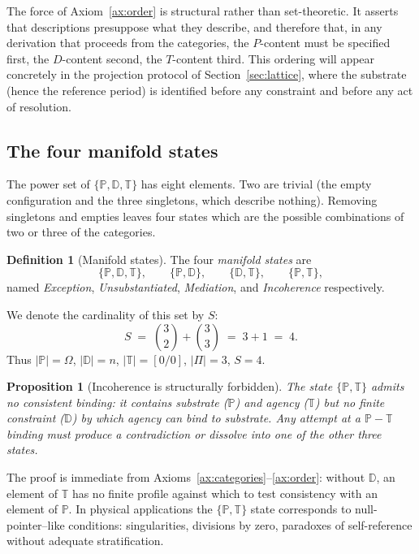 \documentclass[11pt,a4paper]{article}
\newtheorem{proposition}[theorem]{Proposition}
\theoremstyle{definition}
\newtheorem{definition}[theorem]{Definition}
\theoremstyle{remark}
\newcommand{\PP}{\mathbb{P}}
\newcommand{\DD}{\mathbb{D}}
\newcommand{\TT}{\mathbb{T}}
\begin{document}
The force of Axiom~\ref{ax:order} is structural rather than set-theoretic. It asserts that descriptions presuppose what they describe, and therefore that, in any derivation that proceeds from the categories, the $P$-content must be specified first, the $D$-content second, the $T$-content third. This ordering will appear concretely in the projection protocol of Section~\ref{sec:lattice}, where the substrate (hence the reference period) is identified before any constraint and before any act of resolution.

\subsection{The four manifold states}

The power set of $\{\PP,\DD,\TT\}$ has eight elements. Two are trivial (the empty configuration and the three singletons, which describe nothing). Removing singletons and empties leaves four states which are the possible combinations of two or three of the categories.

\begin{definition}[Manifold states]\label{def:states}
The four \emph{manifold states} are
\[
\{\PP,\DD,\TT\},\qquad \{\PP,\DD\},\qquad \{\DD,\TT\},\qquad \{\PP,\TT\},
\]
named \emph{Exception}, \emph{Unsubstantiated}, \emph{Mediation}, and \emph{Incoherence} respectively.
\end{definition}

We denote the cardinality of this set by $S$:
\begin{equation}
S \;=\; \binom{3}{2}+\binom{3}{3} \;=\; 3+1 \;=\; 4.
\label{eq:S}
\end{equation}
Thus $|\PP| = \Omega$, $|\DD| = n$, $|\TT| = [0/0]$, $|\Pi|=3$, $S=4$.

\begin{proposition}[Incoherence is structurally forbidden]\label{prop:incoherence}
The state $\{\PP,\TT\}$ admits no consistent binding: it contains substrate ($\PP$) and agency ($\TT$) but no finite constraint ($\DD$) by which agency can bind to substrate. Any attempt at a $\PP{-}\TT$ binding must produce a contradiction or dissolve into one of the other three states.
\end{proposition}

The proof is immediate from Axioms~\ref{ax:categories}--\ref{ax:order}: without $\DD$, an element of $\TT$ has no finite profile against which to test consistency with an element of $\PP$. In physical applications the $\{\PP,\TT\}$ state corresponds to null-pointer--like conditions: singularities, divisions by zero, paradoxes of self-reference without adequate stratification.
\end{document}
